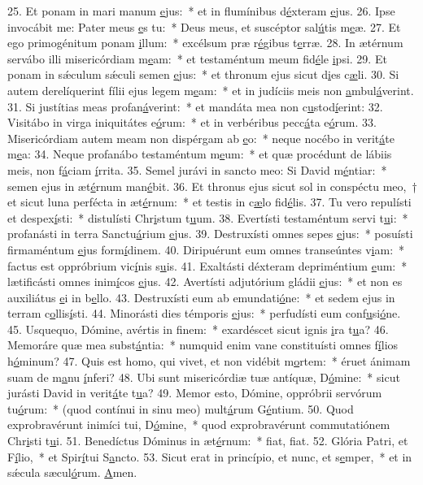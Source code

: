 25. Et ponam in mari manum \uline{e}jus:~* et in flumínibus d\uline{é}xteram \uline{e}jus.
26. Ipse invocábit me: Pater meus \uline{e}s tu:~* Deus meus, et suscéptor sal\uline{ú}tis m\uline{e}æ.
27. Et ego primogénitum ponam \uline{i}llum:~* excélsum præ r\uline{é}gibus t\uline{e}rræ.
28. In ætérnum servábo illi misericórdiam m\uline{e}am:~* et testaméntum meum fid\uline{é}le \uline{i}psi.
29. Et ponam in sǽculum sǽculi semen \uline{e}jus:~* et thronum ejus sicut d\uline{i}es c\uline{æ}li.
30. Si autem derelíquerint fílii ejus legem m\uline{e}am:~* et in judíciis meis non \uline{a}mbul\uline{á}verint.
31. Si justítias meas profan\uline{á}verint:~* et mandáta mea non c\uline{u}stod\uline{í}erint:
32. Visitábo in virga iniquitátes e\uline{ó}rum:~* et in verbéribus pecc\uline{á}ta e\uline{ó}rum.
33. Misericórdiam autem meam non dispérgam ab \uline{e}o:~* neque nocébo in verit\uline{á}te m\uline{e}a:
34. Neque profanábo testaméntum m\uline{e}um:~* et quæ procédunt de lábiis meis, non f\uline{á}ciam \uline{í}rrita.
35. Semel jurávi in sancto meo: Si David m\uline{é}ntiar:~* semen ejus in æt\uline{é}rnum man\uline{é}bit.
36. Et thronus ejus sicut sol in conspéctu meo,~† et sicut luna perfécta in æt\uline{é}rnum:~* et testis in c\uline{æ}lo fid\uline{é}lis.
37. Tu vero repulísti et despex\uline{í}sti:~* distulísti Chr\uline{i}stum t\uline{u}um.
38. Evertísti testaméntum servi t\uline{u}i:~* profanásti in terra Sanctu\uline{á}rium \uline{e}jus.
39. Destruxísti omnes sepes \uline{e}jus:~* posuísti firmaméntum \uline{e}jus form\uline{í}dinem.
40. Diripuérunt eum omnes transeúntes v\uline{i}am:~* factus est oppróbrium vic\uline{í}nis s\uline{u}is.
41. Exaltásti déxteram depriméntium \uline{e}um:~* lætificásti omnes inim\uline{í}cos \uline{e}jus.
42. Avertísti adjutórium gládii \uline{e}jus:~* et non es auxiliátus \uline{e}i in b\uline{e}llo.
43. Destruxísti eum ab emundati\uline{ó}ne:~* et sedem ejus in terram c\uline{o}llis\uline{í}sti.
44. Minorásti dies témporis \uline{e}jus:~* perfudísti eum conf\uline{u}si\uline{ó}ne.
45. Usquequo, Dómine, avértis in f\uline{i}nem:~* exardéscet sicut ignis \uline{i}ra t\uline{u}a?
46. Memoráre quæ mea subst\uline{á}ntia:~* numquid enim vane constituísti omnes f\uline{í}lios h\uline{ó}minum?
47. Quis est homo, qui vivet, et non vidébit m\uline{o}rtem:~* éruet ánimam suam de m\uline{a}nu \uline{í}nferi?
48. Ubi sunt misericórdiæ tuæ antíquæ, D\uline{ó}mine:~* sicut jurásti David in verit\uline{á}te t\uline{u}a?
49. Memor esto, Dómine, oppróbrii servórum tu\uline{ó}rum:~* (quod contínui in sinu meo) mult\uline{á}rum G\uline{é}ntium.
50. Quod exprobravérunt inimíci tui, D\uline{ó}mine,~* quod exprobravérunt commutatiónem Chr\uline{i}sti t\uline{u}i.
51. Benedíctus Dóminus in æt\uline{é}rnum:~* f\uline{i}at, f\uline{i}at.
52. Glória Patri, et F\uline{í}lio,~* et Spir\uline{í}tui S\uline{a}ncto.
53. Sicut erat in princípio, et nunc, et s\uline{e}mper,~* et in sǽcula sæcul\uline{ó}rum. \uline{A}men.
